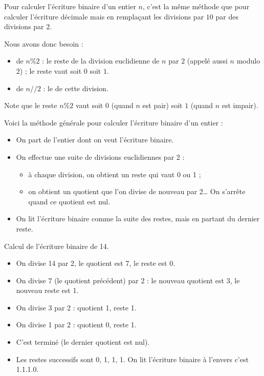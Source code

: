\documentclass[11pt,class=report,crop=false]{standalone}
\begin{document}
\begin{cours}

Pour calculer l'écriture binaire d'un entier $n$, c'est la même méthode que pour calculer l'écriture décimale mais en remplaçant les divisions par $10$ par des divisions par $2$.

Nous avons donc besoin :
  \begin{itemize}
    \item de $n\%2$ : le reste de la division euclidienne de $n$ par $2$ (appelé aussi $n$ modulo $2$) ; le reste vaut soit $0$ soit $1$.
    \item de $n//2$ : le  de cette division. 
  \end{itemize}
  
  Note que le reste  $n\%2$ vaut soit $0$ (quand $n$ est pair) soit $1$ (quand $n$ est impair).
  
  Voici la méthode générale pour calculer l'écriture binaire d'un entier :
\begin{itemize}
  \item On part de l'entier dont on veut l'écriture binaire.
  
  \item On effectue une suite de divisions euclidiennes par 2 : 
  \begin{itemize}
    \item à chaque division, on obtient un reste qui vaut 0 ou 1 ; 
    \item on obtient un quotient que l'on divise de nouveau par 2\ldots{} On s'arrête quand ce quotient est nul.
  \end{itemize}
  
  \item On lit l'écriture binaire comme la suite des restes, mais en partant du dernier reste.
\end{itemize}

\begin{exemple}
Calcul de l'écriture binaire de 14.

\begin{itemize}
  \item On divise 14 par 2, le quotient est 7, le reste est 0.
  \item On divise 7 (le quotient précédent) par 2 : le nouveau quotient est 3, le nouveau reste est 1.
  \item On divise 3 par 2 : quotient 1, reste 1.
  \item On divise 1 par 2 : quotient 0, reste 1.
  \item C'est terminé (le dernier quotient est nul).
  \item Les restes successifs sont 0, 1, 1, 1. On lit l'écriture binaire à l'envers c'est 1.1.1.0.  
\end{itemize}


\end{exemple}
\end{cours}
\end{document}

